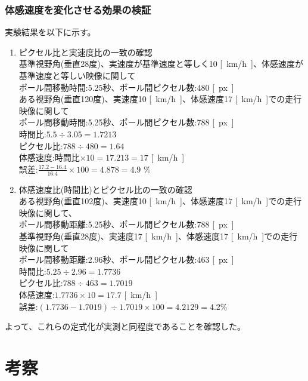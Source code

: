 \clearpage

\subsubsection{体感速度を変化させる効果の検証}
実験結果を以下に示す。
\begin{enumerate}
  \item ピクセル比と実速度比の一致の確認\\
  基準視野角(垂直28度)、実速度が基準速度と等しく10 \si{[km/h]}、体感速度が基準速度と等しい映像に関して\\
  ポール間移動時間:5.25秒、ポール間ピクセル数:480 \si{[px]}\\
  ある視野角(垂直120度)、実速度10 \si{[km/h]}、体感速度17 \si{[km/h]}での走行映像に関して\\
  ポール間移動時間:5.25秒、ポール間ピクセル数:788 \si{[px]}\\
  時間比:$5.5\div 3.05 = 1.7213$\\
  ピクセル比:$788\div 480 = 1.64$\\
  体感速度:時間比$\times 10 = 17.213 = 17$ \si{[km/h]}\\
  誤差:$\frac{17.2-16.4}{16.4}\times 100 = 4.878 = 4.9$ \%
  \item 体感速度比(時間比)とピクセル比の一致の確認\\
  ある視野角(垂直102度)、実速度10 \si{[km/h]}、体感速度17 \si{[km/h]}での走行映像に関して、\\
  ポール間移動距離:5.25秒、ポール間ピクセル数:788 \si{[px]}\\
  基準視野角(垂直28度)、実速度17 \si{[km/h]}、体感速度17 \si{[km/h]}での走行映像に関して\\
  ポール間移動距離:2.96秒、ポール間ピクセル数:463 \si{[px]}\\
  時間比:$5.25\div 2.96 = 1.7736$\\
  ピクセル比:$788\div 463 = 1.7019$\\
  体感速度:$1.7736\times 10 = 17.7$ \si{[km/h]}\\
  誤差:$(1.7736-1.7019)\div 1.7019 \times 100 = 4.2129 = 4.2$\%
\end{enumerate}
よって、これらの定式化が実測と同程度であることを確認した。

\section{考察}
